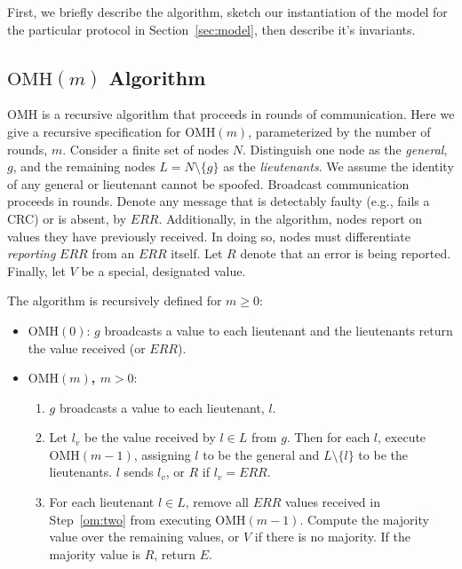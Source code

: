 \documentclass{llncs/llncs}
\newcommand{\OMH}{\ensuremath{\mathrm{OMH}}\xspace}
\newcommand{\ERR}{\ensuremath{\mathit{ERR}}\xspace}
\begin{document}
First, we briefly describe the algorithm, sketch our instantiation of the model for the particular protocol in Section~\ref{sec:model}, then describe it's invariants.


\subsection{$\OMH(m)$ Algorithm}
$\OMH$ is a recursive algorithm that proceeds in rounds of communication. Here we give a recursive specification for $\OMH(m)$, parameterized by the number of rounds, $m$. Consider a finite set of nodes $N$. Distinguish one node as the \emph{general}, $g$, and the remaining nodes $L = N \setminus \{g\}$ as the \emph{lieutenants}. We assume the identity of any general or lieutenant cannot be spoofed. Broadcast communication proceeds in rounds. Denote any message that is detectably faulty (e.g., fails a CRC) or is absent, by $\ERR$. Additionally, in the algorithm, nodes report on values they have previously received. In doing so, nodes must differentiate \emph{reporting} $\ERR$ from an $\ERR$ itself. Let $R$ denote that an error is being reported. Finally, let $V$ be a special, designated value.


The algorithm is recursively defined for $m \ge 0$:

\begin{itemize}
\item {\bf $\OMH(0)$}: $g$ broadcasts a value to each lieutenant and the lieutenants return the value received (or $\ERR$).
\item {\bf $\OMH(m)$, $m > 0$}:
  \begin{enumerate}
  \item $g$ broadcasts a value to each lieutenant, $l$.
  \item\label{om:two} Let $l_v$ be the value received by $l \in L$ from $g$. Then for each $l$, execute $\OMH(m-1)$, assigning $l$ to be the general and $L \setminus \{l\}$ to be the lieutenants. $l$ sends $l_v$, or $R$ if $l_v = \ERR$.
  \item\label{om:three} For each lieutenant $l \in L$, remove all $\ERR$ values received in Step~\ref{om:two} from executing $\OMH(m-1)$. Compute the majority value over the remaining values, or $V$ if there is no majority. If the majority value is $R$, return $E$.
  \end{enumerate}
\end{itemize}
\end{document}
